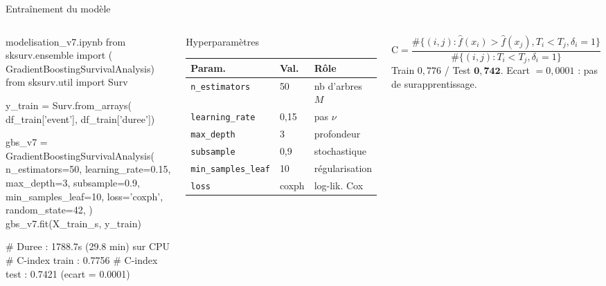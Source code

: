 \documentclass[aspectratio=169,t,11pt]{beamer}
\begin{document}
\begin{frame}[fragile,shrink=20]{Entraînement du modèle}
\vspace{-2pt}
\begin{columns}[T]

\begin{codeslide}{modelisation\_v7.ipynb}
from sksurv.ensemble import (
    GradientBoostingSurvivalAnalysis)
from sksurv.util import Surv

y_train = Surv.from_arrays(
    df_train['event'], df_train['duree'])

gbs_v7 = GradientBoostingSurvivalAnalysis(
    n_estimators=50, learning_rate=0.15,
    max_depth=3, subsample=0.9,
    min_samples_leaf=10,
    loss='coxph', random_state=42,
)
gbs_v7.fit(X_train_s, y_train)

# Duree : 1788.7s (29.8 min) sur CPU
# C-index train : 0.7756
# C-index test  : 0.7421  (ecart = 0.0001)
\end{codeslide}

\begin{block}{Hyperparamètres}
\scriptsize
\begin{tabular}{lll}
\toprule
\textbf{Param.} & \textbf{Val.} & \textbf{Rôle} \\
\midrule
\texttt{n\_estimators}     & 50   & nb d'arbres $M$ \\
\texttt{learning\_rate}    & 0,15 & pas $\nu$ \\
\texttt{max\_depth}        & 3    & profondeur \\
\texttt{subsample}         & 0,9  & stochastique \\
\texttt{min\_samples\_leaf}& 10   & régularisation \\
\texttt{loss}              & coxph & log-lik. Cox \\
\bottomrule
\end{tabular}
\end{block}
\vspace{3pt}
\begin{tcolorbox}[mybox,colback=metGreen!10,colframe=metGreen,
  title={C-index de Harrell}]
\scriptsize
\[
\mathrm{C} = \frac{\#\{(i,j)\!:\hat{f}(x_i)>\hat{f}(x_j),T_i<T_j,\delta_i=1\}}
                 {\#\{(i,j)\!:T_i<T_j,\delta_i=1\}}
\]
Train $0{,}776$ / Test $\mathbf{0{,}742}$.
Ecart $= 0{,}0001$ : pas de surapprentissage.
\end{tcolorbox}
\end{columns}
\end{frame}
\end{document}
